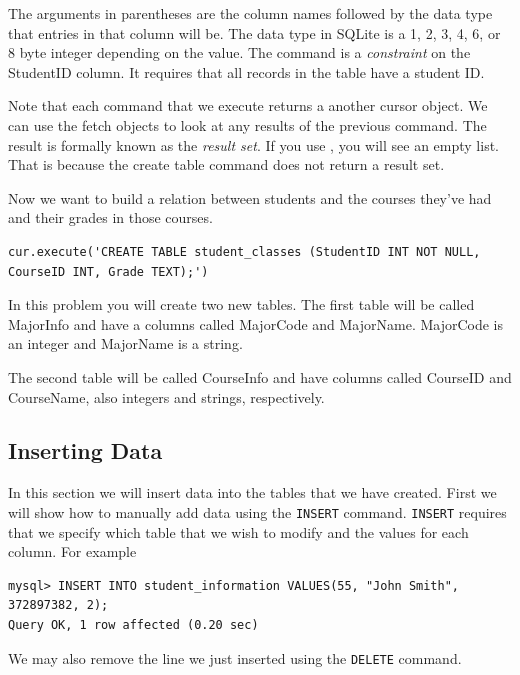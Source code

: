 The arguments in parentheses are the column names followed by the data type that entries in that column will be.  The  data type in SQLite is a 1, 2, 3, 4, 6, or 8 byte integer depending on the value.  The  command is a \emph{constraint} on the StudentID column.  It requires that all records in the table have a student ID.

Note that each command that we execute returns a another cursor object.  We can use the fetch objects to look at any results of the previous command.  The result is formally known as the \emph{result set}.  If you use , you will see an empty list.  That is because the create table command does not return a result set.

Now we want to build a relation between students and the courses they've had and their grades in those courses.
\begin{lstlisting}
cur.execute('CREATE TABLE student_classes (StudentID INT NOT NULL, CourseID INT, Grade TEXT);')
\end{lstlisting}

\begin{problem}
In this problem you will create two new tables.  The first table will be called MajorInfo and have a columns called MajorCode and MajorName.  MajorCode is an integer and MajorName is a string.

The second table will be called CourseInfo and have columns called CourseID and CourseName, also integers and strings, respectively.
\label{prob:new_tables}
\end{problem}



\subsection*{Inserting Data}
In this section we will insert data into the tables that we have created.  First we will show how to manually add data using the {\tt INSERT} command.  {\tt INSERT} requires that we specify which table that we wish to modify and the values for each column.  For example

\begin{lstlisting}
mysql> INSERT INTO student_information VALUES(55, "John Smith", 372897382, 2);
Query OK, 1 row affected (0.20 sec)
\end{lstlisting}

We may also remove the line we just inserted using the {\tt DELETE} command.

